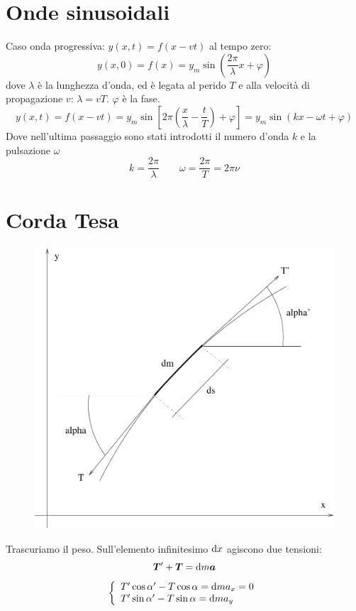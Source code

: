 \section{Onde sinusoidali}
Caso onda progressiva: $y(x,t)=f(x-vt)$
al tempo zero:
\[y(x,0)=f(x)=y_m\sin\left(\frac{2\pi}{\lambda} x + \varphi\right)\]
dove $\lambda$ è la lunghezza d'onda, ed è legata al perido $T$ e alla velocità di propagazione $v$: \(\lambda=vT\). $\varphi$ è la fase.
\[y(x,t)=f(x-vt)=y_m\sin\left[2\pi\left(\frac{x}{\lambda}-\frac{t}{T}\right)+\varphi\right]=y_m\sin\left(kx-\omega t+\varphi\right)\]
Dove nell'ultima passaggio sono stati introdotti il numero d'onda $k$ e la pulsazione $\omega$
\[k=\frac{2\pi}{\lambda}\qquad \omega=\frac{2\pi}{T}=2\pi\nu\]

\section{Corda Tesa}
\begin{figure}[htbp]
   \centering
   \includegraphics[scale=0.4]{immagini/fisica1/Onde_Corda}
\end{figure}
Trascuriamo il peso. Sull'elemento infinitesimo $\mathrm{d} x$ agiscono due tensioni:
\[\boldsymbol{T}'+\boldsymbol{T}=\mathrm{d} m \boldsymbol{a}\]
\[\left\{\begin{array}{l}
      T'\cos\alpha'-T\cos\alpha=\mathrm{d} m a_x=0 \\
      T'\sin\alpha'-T\sin\alpha=\mathrm{d} m a_y   \\
   \end{array}\right.\]
